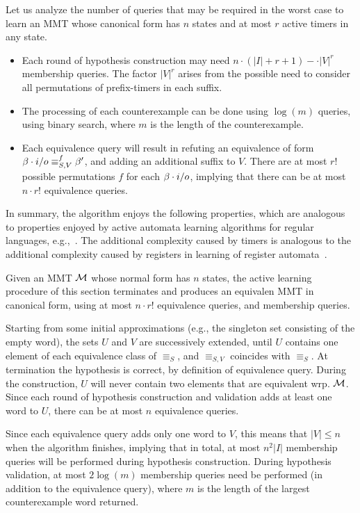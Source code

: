 Let us analyze the number of queries that may be required in the worst case
to learn an MMT whose canonical form has $n$ states and at most $r$ active
timers in any state.
\begin{itemize}
\item
  Each round of hypothesis construction may need $n\cdot(|I|+r+1)-\cdot |V|^r$
  membership queries. The factor $|V|^r$ arises from the possible
  need to consider all   permutations of prefix-timers in each suffix.
\item
  The processing of each counterexample can be done using $\log(m)$ queries,
  using binary search, where $m$ is the length of the counterexample.
\item
  Each equivalence query will result in refuting an equivalence of form
  $\beta\cdot i/o \equiv_{S,V}^f \beta'$, and
  adding an additional suffix to $V$. There are at most
  $r !$ possible permutations $f$ for each $\beta\cdot i/o$,
  implying that there can be at most $n \cdot r!$ equivalence queries.
\end{itemize}
In summary,
the algorithm enjoys the following properties, which are analogous
to properties
enjoyed by active automata learning algorithms for regular languages,
e.g.,~\cite{Ang87}. The additional complexity caused by timers is analogous
to the additional complexity caused by registers in learning of register
automata~\cite{HowarSJC12,CasselHJS16}.

\begin{theorem}
  \label{thm:alg:termination}
  Given an MMT ${\mathcal M}$ whose normal form has $n$ states, the active learning
  procedure of this section terminates and produces an equivalen MMT in
  canonical form, using at most $n\cdot r!$ equivalence queries, and
   membership queries.
\end{theorem}



Starting from some initial approximations (e.g., the singleton
set consisting of the empty word), the sets $U$ and $V$ are
successively extended, until $U$ contains one element of each equivalence
class of $\equiv_{S}$, and $\equiv_{S,V}$ coincides with
$\equiv_{S}$. 
At termination the hypothesis is correct, by definition of equivalence query.
During the construction, $U$ will never contain two elements that are
equivalent wrp. ${\mathcal M}$.
Since each round of hypothesis construction and validation adds at least one
word to $U$, there can be at most $n$ equivalence queries.


Since each equivalence query adds only one
word to $V$, this means that $|V| \leq n$ when the algorithm finishes,
implying that in total, at most $n^2|I|$ membership queries
will be performed during hypothesis construction.
During hypothesis
validation, at most $2\log(m)$ membership queries need be performed
(in addition to the equivalence query), where
$m$ is the length of the largest counterexample word returned.

